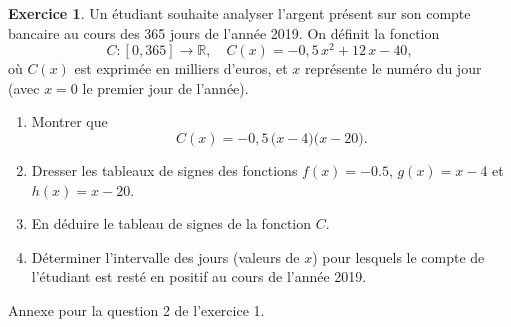 \documentclass{article}
\theoremstyle{definition}
\newtheorem{exercice}{Exercice}
\begin{document}
\begin{exercice}
  Un étudiant souhaite analyser l'argent présent sur son compte bancaire au cours des 365 jours de l'année 2019.
  On définit la fonction
  \[
    C : [0, 365] \to \mathbb{R}, \quad C(x) = -0{,}5\,x^2 + 12\,x - 40,
  \]
  où \(C(x)\) est exprimée en milliers d'euros, et \(x\) représente le numéro du jour (avec \(x=0\) le premier jour de l'année).

  \begin{enumerate}
    \item Montrer que
      \[
        C(x) = -0{,}5\,\bigl(x - 4\bigr)\bigl(x - 20\bigr).
      \]
    \item Dresser les tableaux de signes des fonctions $f(x) = -0.5$, $g(x) = x - 4$ et $h(x) = x - 20$.
    \item En déduire le tableau de signes de la fonction \(C\).
    \item Déterminer l'intervalle des jours (valeurs de \(x\)) pour lesquels le compte de l'étudiant est resté en positif au cours de l'année 2019.
  \end{enumerate}
\end{exercice}
\begin{center}
\end{center}

% 

\begin{center}
  \begin{tcolorbox}[hbox]
    \Large
    Annexe pour la question 2 de l'exercice 1.
  \end{tcolorbox}
\end{center}
\end{document}

